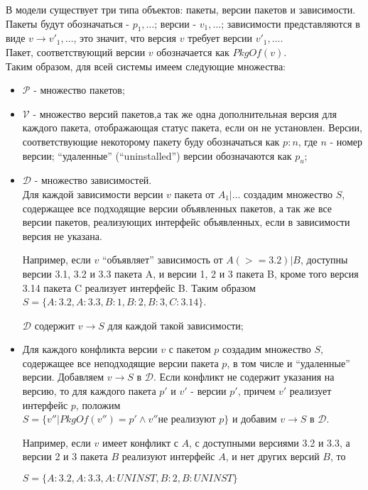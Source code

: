 В модели\cite{dependencies_model} существует три типа объектов: пакеты, версии пакетов и зависимости.
Пакеты будут обозначаться - $p_1, \dots$; версии - $v_1, \dots$; зависимости 
представляются в виде $v \to {v'_1, \dots}$, это значит, что версия $v$ требует
версии ${v'_1, \dots}$. \\
Пакет, соответствующий версии $v$ обозначается как $PkgOf(v)$.\\
Таким образом, для всей системы имеем следующие множества:
\begin{itemize}
\item{
$\mathcal{P}$ - множество пакетов;
}
\item{
$\mathcal{V}$ - множество версий пакетов,а так же одна дополнительная версия для каждого пакета,
отображающая статус пакета, если он не установлен. Версии, соответствующие некоторому пакету
буду обозначаться как $p: n$, где $n$ - номер версии; ``удаленные'' (``uninstalled'') версии
обозначаются как $p_u$;
}
\item{
$\mathcal{D}$ - множество зависимостей.\\
 Для каждой зависимости версии $v$ пакета от $A_1 | \dots$
создадим множество $S$, содержащее все подходящие версии объявленных пакетов, 
а так же все версии пакетов, реализующих интерфейс объявленных, если в зависимости 
версия не указана.

Например, если $v$ ``объявляет'' зависимость от $A (>= 3.2) | B$, 
доступны версии 3.1, 3.2 и 3.3 пакета A, и версии 1, 2 и 3 пакета B,
кроме того версия 3.14 пакета C реализует интерфейс B. 
Таким образом $S = \{A:3.2,A:3.3,B:1,B:2,B:3,C:3.14\} $. 

$\mathcal{D}$ содержит $v \to S$ для каждой такой зависимости;
}
\item{
Для каждого конфликта версии $v$ с пакетом $p$ создадим множество $S$, содержащее все
неподходящие версии пакета $p$, в том числе и ``удаленные'' версии. Добавляем $v \to S$
в $\mathcal{D}$. Если конфликт не содержит указания на версию, то для каждого пакета $p'$ и $v'$ -
версии $p'$, причем $v'$ реализует интерфейс $p$, положим \\
$S = \{v''|PkgOf(v'') = p' \wedge v'' \text{не реализуют $p$}\} $
и добавим $v \to S$ в $\mathcal{D}$.

Например, если $v$ имеет конфликт с $A$, с доступными версиями 3.2 и 3.3, а версии 2 и 3 пакета $B$
реализуют интерфейс $A$, и нет других версий $B$, то

$S = \{A:3.2, A:3.3, A:UNINST, B:2, B:UNINST\}$
}
\end{itemize}

